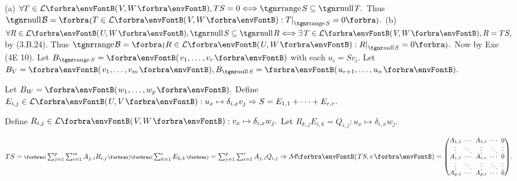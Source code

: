 (a) $\forall T\in\Lm{V,W},TS=0\Longleftrightarrow\range S\subseteq\null T.$ Thus $\null\mB=\Bra{T\in\Lm{V,W}:T\mmid_{\range S}=0}.$\parSol{\vspace{2pt}}
(b) $\forall R\in\Lm{U,W},\null S\subseteq\null R\Longleftrightarrow\exists\,T\in\Lm{V,W},R=TS,$ by (3.B.24).\parSol{\Hb}
Thus $\range\mB=\Bra{R\in\Lm{U,W}:R\mmid_{\null S}=0}.$ \;Now by Exe (4E 10).\PfEnd\vspace{4pt}\quad
\Or Let $B_{\range S}=\Par{v_1,\dots,v_r}$ with each $u_i=Sv_i.$ Let $B_V=\Par{v_1,\dots,v_m},B_{\null S}=\Par{u_{r+1},\dots,u_n}.$\par\quad
Let $B_W=\Par{w_1,\dots,w_p}.$ Define $E_{i,j}\in\Lm{U,V}:u_x\mapsto\delta_{i,x}v_j\Rightarrow S=E_{1,1}+\dots+E_{r,r}.$\par\quad
Define $R_{i,j}\in\Lm{V,W}:v_x\mapsto\delta_{i,x}w_j.$ Let $R_{k,j}E_{i,k}=Q_{i,j}:u_x\mapsto\delta_{i,x}w_j.$\par\vspace{-20pt}\quad
$TS=\XPar{{\sum_{j=1}^p\sum_{i=1}^m A_{j,\,i}R_{i,j}}}\XPar{{\sum_{k=1}^r E_{k,k}}}=\sum_{j=1}^p\sum_{i=1}^r A_{j,\,i}Q_{i,j}\Rightarrow\Mt{TS,v}={\small\begin{pmatrix}
		A_{1,1} &\hspace{-6pt} \cdots &\hspace{-6pt} A_{1,r} &\hspace{-6pt} \cdots &\hspace{-6pt} 0\\[-2pt]
		\vdots  &\hspace{-6pt} \ddots &\hspace{-6pt} \vdots  &\hspace{-6pt} \ddots &\hspace{-6pt} \vdots\\[-4pt]
		A_{r,1} &\hspace{-6pt} \cdots &\hspace{-6pt} A_{r,r} &\hspace{-6pt} \cdots &\hspace{-6pt} 0\\[-2pt]
		\vdots  &\hspace{-6pt} \ddots &\hspace{-6pt} \vdots  &\hspace{-6pt} \ddots &\hspace{-6pt} \vdots\\[-4pt]
		A_{p,1} &\hspace{-6pt} \cdots &\hspace{-6pt} A_{p,r} &\hspace{-6pt} \cdots &\hspace{-6pt} 0\end{pmatrix}}.$\par\vspace{-20pt}\quad

